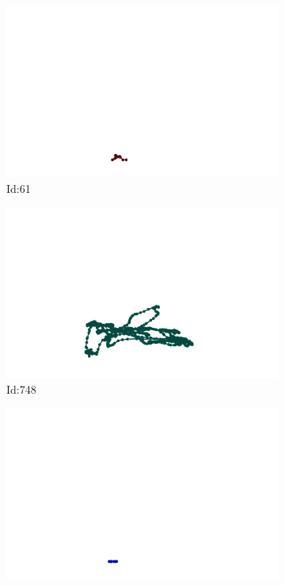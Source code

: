 \documentclass[12pt,twoside]{report}
\begin{document}
\begin{figure}
\centering
\begin{subfigure}[b]{0.20\textwidth}
\centering
\includegraphics[width=\textwidth]{../../trajectories/61.png}
\caption{Id:61}
\end{subfigure}
\begin{subfigure}[b]{0.20\textwidth}
\centering
\includegraphics[width=\textwidth]{../../trajectories/748.png}
\caption{Id:748}
\end{subfigure}
\begin{subfigure}[b]{0.20\textwidth}
\centering
\includegraphics[width=\textwidth]{../../trajectories/833.png}

\end{subfigure}
\end{figure}
\end{document}
